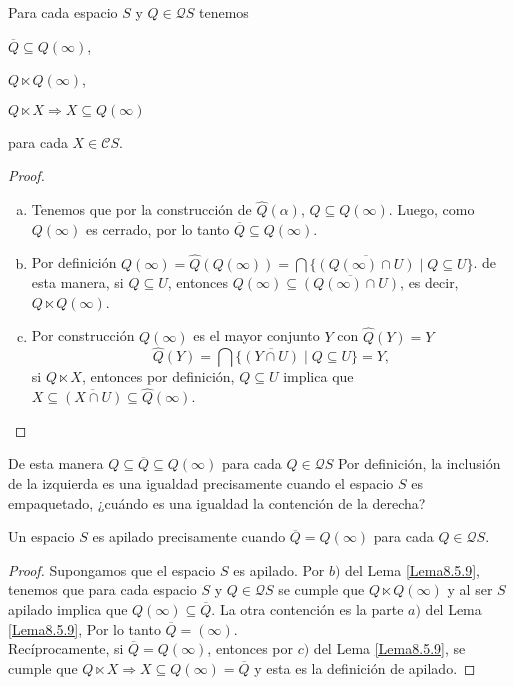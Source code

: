 \begin{lem}\label{Lema8.5.9}
    Para cada espacio $S$ y $Q\in \mathcal{Q}S$ tenemos
    \begin{enumerate}[a)]
    \begin{multicols}{3}
        \item $\overline{Q}\subseteq Q(\infty)$,
        \item $Q\ltimes Q(\infty)$,
        \item  $Q\ltimes X\Rightarrow X\subseteq Q(\infty)$
    \end{multicols}
    \end{enumerate}
    para cada $X\in \mathcal{C}S$.
\end{lem}

\begin{proof}
    \begin{enumerate}[a)]
        \item Tenemos que por la construcción de $\hat{Q}(\alpha)$, $Q\subseteq Q(\infty)$. Luego, como $Q(\infty)$ es cerrado, por lo tanto $\overline{Q}\subseteq Q(\infty)$.

        \item Por definición $Q(\infty)=\hat{Q}(Q(\infty))=\bigcap\{\overline{(Q(\infty)\cap U)}\mid Q\subseteq U\}$. de esta manera, si $Q\subseteq U$, entonces $Q(\infty)\subseteq \overline{(Q(\infty)\cap U)}$, es decir, $Q\ltimes Q(\infty)$.

        \item Por construcción $Q(\infty)$ es el mayor conjunto $Y$ con $\hat{Q}(Y)=Y$
        \[
        \hat{Q}(Y)=\bigcap\{\overline{(Y\cap U)}\mid Q\subseteq U\}=Y,
        \]
        si $Q\ltimes X$, entonces por definición, $Q\subseteq U$ implica que $X\subseteq \overline{(X\cap U)}\subseteq \hat{Q}(\infty)$.
    \end{enumerate}
\end{proof}

De esta manera $Q\subseteq \overline{Q}\subseteq Q(\infty)$ para cada $Q\in \mathcal{Q}S$ Por definición, la inclusión de la izquierda es una igualdad precisamente cuando el espacio $S$ es empaquetado, ¿cuándo es una igualdad la contención de la derecha?

\begin{cor}\label{Corolario8.5.10}
    Un espacio $S$ es apilado precisamente cuando $\overline{Q}=Q(\infty)$ para cada $Q\in \mathcal{Q}S$.
\end{cor}

\begin{proof}
    Supongamos que el espacio $S$ es apilado. Por $b)$ del Lema \ref{Lema8.5.9}, tenemos que para cada espacio $S$ y $Q\in \mathcal{Q}S$ se cumple que $Q\ltimes Q(\infty)$ y al ser $S$ apilado implica que $Q(\infty)\subseteq \overline{Q}$. La otra contención es la parte $a)$ del Lema \ref{Lema8.5.9}, Por lo tanto $\overline{Q}=(\infty)$.\\

    Recíprocamente, si $\overline{Q}=Q(\infty)$, entonces por $c)$ del Lema \ref{Lema8.5.9}, se cumple que $Q\ltimes X\Rightarrow X\subseteq Q(\infty)=\overline{Q}$ y esta es la definición de apilado.
\end{proof}

